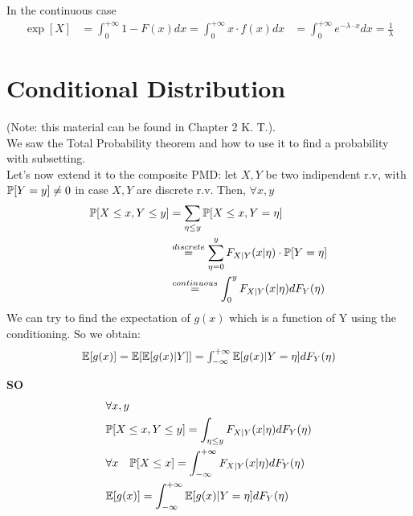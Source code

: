 In the continuous case
\begin{equation}
  \begin{split}
    \exp[X] &= \int_{0}^{+\infty} 1-F(x) dx = \int_{0}^{+\infty} x \cdot f(x) dx
    &=\int_{0}^{+\infty} e^{-\lambda \cdot x} dx = \frac{1}{\lambda}
  \end{split}
\end{equation}

\section{Conditional Distribution}
(Note: this material can be found in Chapter 2 K. T.).\\
We saw the Total Probability theorem and how to use it to find a probability with subsetting.\\
Let's now extend it to the composite PMD: let $X,Y$ be two indipendent r.v, with $\mathbb{P}[Y=y]\neq 0$ in case $X,Y$ are discrete r.v.
Then, $\forall x,y$
\begin{equation}
  \begin{split}
    \mathbb{P}[X\le x, Y \le y] &= \sum \limits_{\eta \le y} \mathbb{P}[X \le x , Y = \eta] \\
    &\stackrel{discrete}{=} \sum \limits_{\eta =0}^{y} F_{X|Y}(x | \eta) \cdot \mathbb{P}[Y=\eta]\\
    &\stackrel{continuous}{=} \int_{0}^{y} F_{X|Y}(x|\eta) dF_Y(\eta)
  \end{split}
\end{equation}
We can try to find the expectation of $g(x)$ which is a function of Y using the conditioning. So we obtain:
\begin{equation}
  $$\exp[g(x)]=\exp[\exp[g(x)|Y]] = \int_{-\infty}^{+\infty}\exp[g(x)|Y=\eta] dF_Y(\eta)$$
\end{equation}

\textbf{SO}
\begin{equation}
  \begin{split}
   &\forall x,y \\
  &\mathbb{P}[X\le x , Y \le y] = \int_{\eta \le y} F_{X|Y}(x|\eta) dF_Y(\eta)\\
  &\forall x \quad \mathbb{P}[X \le x] = \int_{-\infty}^{+\infty}F_{X|Y}(x|\eta) dF_Y(\eta) \\
  &\mathbb{E}[g(x)]=\int_{-\infty}^{+\infty}
  \mathbb{E}[g(x)|Y=\eta] dF_Y(\eta)
  \end{split}
\end{equation}


